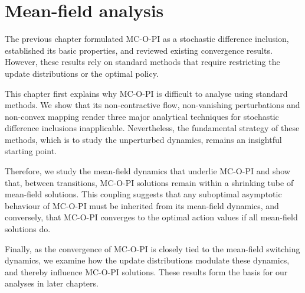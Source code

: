 \chapter{Mean-field analysis}
\label{ch: exact mcopi}

\ifpdf
    \graphicspath{{Chapter3/Figs/Raster/}{Chapter3/Figs/PDF/}{Chapter3/Figs/}}
\else
    \graphicspath{{Chapter3/Figs/Vector/}{Chapter3/Figs/}}
\fi


The previous chapter formulated MC-O-PI as a stochastic difference inclusion, established its basic properties, and reviewed existing convergence results.
However, these results rely on standard methods that require restricting the update distributions or the optimal policy.


This chapter first explains why MC-O-PI is difficult to analyse using standard methods.
We show that its non-contractive flow, non-vanishing perturbations and non-convex mapping render three major analytical techniques for stochastic difference inclusions inapplicable.
Nevertheless, the fundamental strategy of these methods, which is to study the unperturbed dynamics, remains an insightful starting point.


Therefore, we study the mean-field dynamics that underlie MC-O-PI
and show that, between transitions, MC-O-PI solutions remain within a shrinking tube of mean-field solutions.
This coupling suggests that any suboptimal asymptotic behaviour of MC-O-PI must be inherited from its mean-field dynamics, and conversely, that MC-O-PI converges to the optimal action values if all mean-field solutions do.


Finally,
as the convergence of MC-O-PI is closely tied to the mean-field switching dynamics,
we examine how the update distributions modulate these dynamics,
and thereby influence MC-O-PI solutions.
These results form the basis for our analyses in later chapters.



